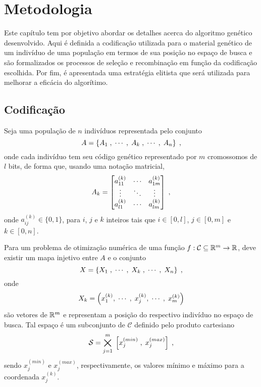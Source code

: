 \chapter{Metodologia}\label{cap_metodologia}

Este capítulo tem por objetivo abordar os detalhes acerca do algoritmo genético
desenvolvido. Aqui é definida a codificação utilizada para o material genético
de um indivíduo de uma população em termos de sua posição no espaço de busca e
são formalizados os processos de seleção e recombinação em função da codificação
escolhida. Por fim, é apresentada uma estratégia elitista que será utilizada
para melhorar a eficácia do algorítimo.

\section{Codificação}

\newcommand{\kth}[2]{{#1}^{(k)}_{#2}}
\newcommand{\kpth}[2]{{#1}^{(k + 1)}_{#2}}
\newcommand{\xmin}[1]{x^{(min)}_{#1}}
\newcommand{\xmax}[1]{x^{(max)}_{#1}}

Seja uma população de $n$ indivíduos representada pelo conjunto
\begin{equation}
  A = \left\{ A_1\;, \;\cdots\;,  \;A_k\;, \;\cdots\;, \;A_n \right\} \;\mathrm{,}
\end{equation}
onde cada indivíduo tem seu código genético representado por $m$ cromossomos
de $l$ bits, de forma que, usando uma notação matricial,
\begin{equation}
  A_k = \left[
    \begin{matrix}
      \kth{a}{11} & \cdots & \kth{a}{1m} \\
      \vdots      & \ddots & \vdots      \\
      \kth{a}{l1} & \cdots & \kth{a}{lm} \\
    \end{matrix}
    \right]
  \mathcomma
\end{equation}
onde $ \kth{a}{ij} \in \{0,1\} $, para $i$, $j$ e $k$ inteiros tais que
$ i \in \left[ 0, l \right] $, $ j \in \left[ 0, m \right] $ e $ k \in \left[ 0, n \right] $.

Para um problema de otimização numérica de uma função $ f : \mathcal{C} \subseteq \mathbb{R}^m \rightarrow \mathbb{R} $,
deve existir um mapa injetivo entre $A$ e o conjunto
\begin{equation}
  X = \left\{ X_1 \; , \;\cdots\;,  \; X_k \; , \;\cdots\;, \; X_n \right\} \;\mathrm{,}
\end{equation}
onde
\begin{equation}
  X_k = \left( \kth{x}{1}, \mathdots, \; \kth{x}{j}, \mathdots, \; \kth{x}{m} \right)
\end{equation}
são vetores de $ \mathbb{R}^m $ e representam a posição do respectivo indivíduo no espaço de busca.
Tal espaço é um subconjunto de $ \mathcal{C} $ definido pelo produto cartesiano
\begin{equation}
  \mathcal{S} = \bigtimes_{j = 1}^m \; \left[ \xmin{j} \; , \; \xmax{j} \right] \mathcomma
  \label{eq:search_region}
\end{equation}
sendo $ \xmin{j} $ e $ \xmax{j} $, respectivamente, os valores mínimo e máximo para
a coordenada $ \kth{x}{j} $.


